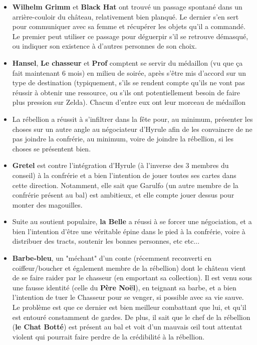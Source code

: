 {\begin{itemize}
		\item \textbf{Wilhelm Grimm} et \textbf{Black Hat} ont trouvé un passage spontané dans un arrière-couloir du château, relativement bien planqué. Le dernier s'en sert pour communiquer avec sa femme et récupérer les objets qu'il a commandé. Le premier peut utiliser ce passage pour déguerpir s'il se retrouve démasqué, ou indiquer son existence à d'autres personnes de son choix.
		\item \textbf{Hansel}, \textbf{Le chasseur} et \textbf{Prof} comptent se servir du médaillon (vu que ça fait maintenant 6 mois) en milieu de soirée, après s'être mis d'accord sur un type de destination (typiquement, s'ils se rendent compte qu'ils ne vont pas réussir à obtenir une ressource, ou s'ils ont potentiellement besoin de faire plus pression sur Zelda). Chacun d'entre eux ont leur morceau de médaillon
		
		\item La rébellion a réussit à s'infiltrer dans la fête pour, au minimum, présenter les choses sur un autre angle au négociateur d'Hyrule afin de les convaincre de ne pas joindre la confrérie, au minimum, voire de joindre la rébellion, si les choses se présentent bien.
		
		\item \textbf{Gretel} est contre l'intégration d'Hyrule (à l'inverse des 3 membres du conseil) à la confrérie et a bien l'intention de jouer toutes ses cartes dans cette direction. Notamment, elle sait que Garulfo (un autre membre de la confrérie présent au bal) est ambitieux, et elle compte jouer dessus pour monter des magouilles.
		
		\item Suite au soutient populaire, \textbf{la Belle} a réussi à se forcer une négociation, et a bien l'intention d'être une véritable épine dans le pied à la confrérie, voire à distribuer des tracts, soutenir les bonnes personnes, etc etc...
		
		\item \textbf{Barbe-bleu}, un "méchant" d'un conte (récemment reconverti en coiffeur/boucher et également membre de la rébellion) dont le château vient de se faire raider par le chasseur (en emportant sa collection). Il est venu sous une fausse identité (celle du \textbf{Père Noël}), en teignant sa barbe, et a bien l'intention de tuer le Chasseur pour se venger, si possible avec sa vie sauve. Le problème est que ce dernier est bien meilleur combattant que lui, et qu'il est entouré constamment de gardes. De plus, il sait que le chef de la rébellion (\textbf{le Chat Botté}) est présent au bal et voit d'un mauvais œil tout attentat violent qui pourrait faire perdre de la crédibilité à la rébellion.
	\end{itemize}
	
}

